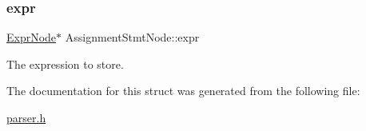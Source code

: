 \subsubsection{\texorpdfstring{expr}{expr}}
{\footnotesize\ttfamily \hyperlink{struct_expr_node}{Expr\+Node}$\ast$ Assignment\+Stmt\+Node\+::expr}

The expression to store. 

The documentation for this struct was generated from the following file\+:\begin{DoxyCompactItemize}
\item 
\hyperlink{parser_8h}{parser.\+h}\end{DoxyCompactItemize}
